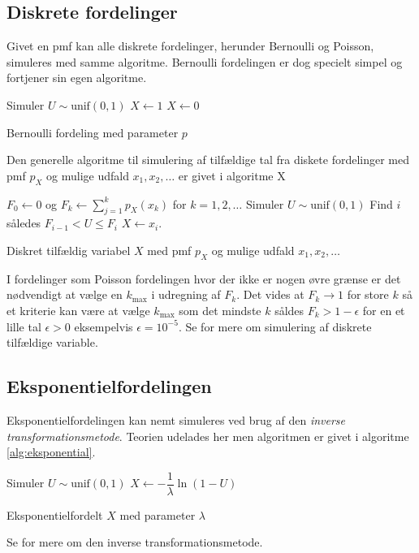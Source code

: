 \subsection{Diskrete fordelinger}
Givet en pmf kan alle diskrete fordelinger, herunder Bernoulli og Poisson, simuleres med samme algoritme. Bernoulli fordelingen er dog specielt simpel og fortjener sin egen algoritme. 
\begin{algorithm}[H]
\begin{algorithmic}
\STATE Simuler $U \sim \text{unif}(0,1)$
\STATE $X \gets 1$
\ELSE
\STATE $X \gets 0$
\ENDIF
\end{algorithmic}
\caption{Bernoulli fordeling med parameter $p$} \label{alg:bernoulli}
\end{algorithm}
Den generelle algoritme til simulering af tilfældige tal fra diskete fordelinger med pmf $p_X$ og mulige udfald $x_1, x_2,\dots$ er givet i algoritme X
\begin{algorithm}[H]
\begin{algorithmic}
\STATE $F_0 \gets 0$ og $F_k \gets \sum_{j=1}^k p_X(x_k)$ for $k = 1,2,\dots$ 
\STATE Simuler $U \sim \text{unif}(0,1)$
\STATE Find $i$ således $F_{i-1} < U \leq F_i$
\STATE $X \gets x_i$. 
\end{algorithmic}
\caption{Diskret tilfældig variabel $X$ med pmf $p_X$ og mulige udfald $x_1,x_2,\dots$} \label{alg:bernoulli}
\end{algorithm}
I fordelinger som Poisson fordelingen hvor der ikke er nogen øvre grænse er det nødvendigt at vælge en $k_{\max}$ i udregning af $F_k$. Det vides at $F_k \to 1$ for store $k$ så et kriterie kan være at vælge $k_{\max}$ som det mindste $k$ såldes $F_k > 1 - \epsilon$ for en et lille tal $\epsilon > 0$ eksempelvis $\epsilon = 10^{-5}$. Se \cite[283-285]{olofsson2012} for mere om simulering af diskrete tilfældige variable. 
\subsection{Eksponentielfordelingen}
Eksponentielfordelingen kan nemt simuleres ved brug af den \emph{inverse transformationsmetode}. Teorien udelades her men algoritmen er givet i algoritme \ref{alg:eksponential}. 
\begin{algorithm}[H]
\begin{algorithmic}
\STATE Simuler $U \sim \text{unif}(0,1)$
\STATE $X \gets -\dfrac{1}{\lambda}\ln(1-U)$ 
\end{algorithmic}
\caption{Eksponentielfordelt $X$ med parameter $\lambda$} \label{alg:eksponential}
\end{algorithm}
Se \cite[285-287]{olofsson2012} for mere om den inverse transformationsmetode. 
